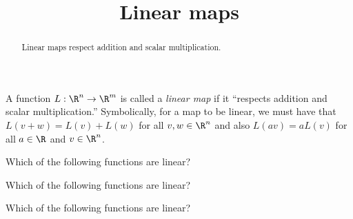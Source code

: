 \documentclass{ximera}
\title{Linear maps}
\begin{document}
\begin{abstract}
  Linear maps respect addition and scalar multiplication.
\end{abstract}

\begin{definition}
  A function $L: \R^n \to \R^m$ is called a \textit{linear map} if it
  ``respects addition and scalar multiplication.''  Symbolically, for
  a map to be linear, we must have that $L(v+w) = L(v)+L(w)$ for all
  $v,w \in \R^n$ and also $L(av) = a L(v)$ for all $a \in \R$ and
  $v\in \R^n$.
\end{definition}


\begin{question}
  Which of the following functions are linear?
  \begin{solution}
    \begin{multiple-choice}
    \end{multiple-choice}
  \end{solution}
\end{question}

\begin{question}
  Which of the following functions are linear?
  \begin{solution}
    \begin{multiple-choice}
    \end{multiple-choice}
  \end{solution}
\end{question}

\begin{question}
  Which of the following functions are linear?
  \begin{solution}
    \begin{multiple-choice}
    \end{multiple-choice}
  \end{solution}
\end{question}
	
\end{document}

